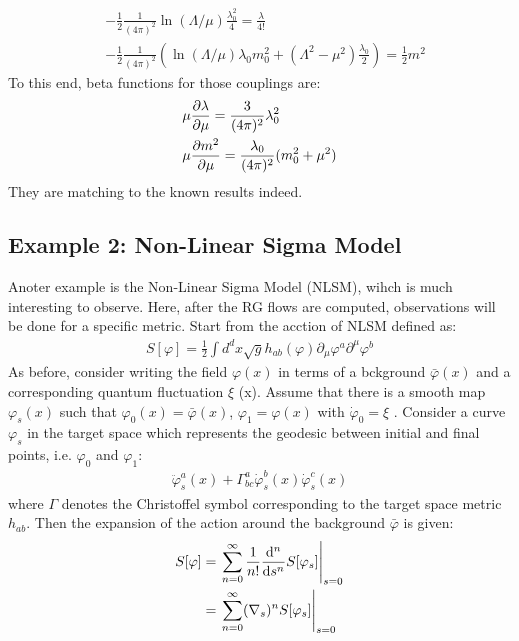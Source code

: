 \begin{align}
    &-\frac{1}{2} \frac{1}{(4\pi)^{2}} \ln (\Lambda / \mu) \frac{\lambda _{0} ^{2}}{4} = \frac{\lambda}{4!} \\
    &-\frac{1}{2} \frac{1}{(4\pi)^{2}} (\ln (\Lambda / \mu) \lambda _{0} m_{0}^{2} + (\Lambda ^{2} - \mu ^{2}) \frac{\lambda _{0}}{2}) = \frac{1}{2} m^{2} 
\end{align}
To this end, beta functions for those couplings are:
\begin{align}
    &\mu \pdv{\lambda}{\mu} = \frac{3}{(4\pi)^{2}} \lambda _{0} ^{2}\\
    &\mu \pdv{m^{2}}{\mu} = \frac{\lambda _{0}}{(4\pi)^{2}} (m_{0}^{2} + \mu ^{2})
\end{align}
They are matching to the known results indeed.

\subsection{Example 2: Non-Linear Sigma Model}
Anoter example is the Non-Linear Sigma Model (NLSM), wihch is much interesting to observe. Here, after the RG flows are computed, observations will be done for a specific metric. Start from the acction of NLSM defined as:
\begin{align}
    S[\varphi] = \frac{1}{2} \int d^{d}x \sqrt{g} h_{ab} (\varphi) \partial _{\mu} \varphi ^{a} \partial ^{\mu} \varphi ^{b}
\end{align}
As before, consider writing the field $\varphi (x)$ in terms of a bckground $\bar {\varphi} (x)$ and a corresponding quantum fluctuation $\xi$ (x). Assume that there is a smooth map $\varphi_{s} (x)$ such that $\varphi _{0} (x) = \bar{\varphi}(x)$, $\varphi_{1} = \varphi (x)$ with $\dot{\varphi} _{0} = \xi$ . Consider a curve $\varphi _{s}$ in the target space which represents the geodesic between initial and final points, i.e. $\varphi _{0}$ and $\varphi _{1}$:
\begin{align}
    \ddot{\varphi}_{s} ^{a} (x) + \Gamma _{bc}^{a} \dot{\varphi} _{s}^{b}(x) \dot{\varphi} _{s}^{c} (x)  
\end{align}
where $\Gamma$ denotes the Christoffel symbol corresponding to the target space metric $h_{ab}$. Then the expansion of the action around the background $\bar{\varphi}$ is given:
\begin{align}
    S[\varphi] &=\eval {\sum_{n=0}^{\infty} \frac{1}{n!} \dv[n] {s} S[\varphi _{s}]} _{s=0} \nonumber \\
    & = \eval {\sum_{n=0}^{\infty} (\nabla _{s})^{n} S[\varphi _{s}]} _{s=0}
\end{align}

